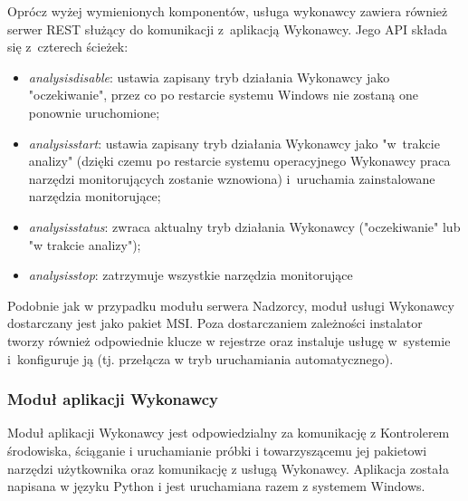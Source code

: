 \documentclass[a4paper,12pt,oneside]{article}
\begin{document}
	Oprócz wyżej wymienionych komponentów, usługa wykonawcy zawiera również serwer REST służący do komunikacji z~aplikacją Wykonawcy. Jego API składa się z~czterech ścieżek:
	
	\begin{itemize}
		\item \textit{analysisdisable}: ustawia zapisany tryb działania Wykonawcy jako "oczekiwanie", przez co po restarcie systemu Windows nie zostaną one ponownie uruchomione;
	
		\item \textit{analysisstart}: ustawia zapisany tryb działania Wykonawcy jako "w~trakcie analizy" (dzięki czemu po restarcie systemu operacyjnego Wykonawcy praca narzędzi monitorujących zostanie wznowiona) i~uruchamia zainstalowane narzędzia monitorujące;
		
		\item \textit{analysisstatus}: zwraca aktualny tryb działania Wykonawcy ("oczekiwanie" lub "w trakcie analizy");
		
		\item \textit{analysisstop}: zatrzymuje wszystkie narzędzia monitorujące
	\end{itemize}
	
	Podobnie jak w przypadku modułu serwera Nadzorcy, moduł usługi Wykonawcy dostarczany jest jako pakiet MSI. Poza dostarczaniem zależności instalator tworzy również odpowiednie klucze w rejestrze oraz instaluje usługę w~systemie i~konfiguruje ją (tj. przełącza w tryb uruchamiania automatycznego).
	
	\subsubsection{Moduł aplikacji Wykonawcy}
	
	Moduł aplikacji Wykonawcy jest odpowiedzialny za komunikację z Kontrolerem środowiska, ściąganie i uruchamianie próbki i towarzyszącemu jej pakietowi narzędzi użytkownika oraz komunikację z usługą Wykonawcy. Aplikacja została napisana w języku Python i jest uruchamiana razem z systemem Windows.
	
\end{document}
